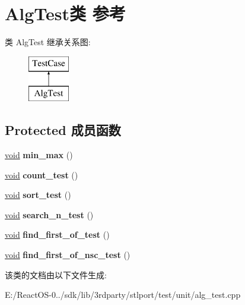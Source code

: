 \hypertarget{class_alg_test}{}\section{Alg\+Test类 参考}
\label{class_alg_test}
类 Alg\+Test 继承关系图\+:\begin{figure}[H]
\begin{center}
\leavevmode
\includegraphics[height=2.000000cm]{class_alg_test}
\end{center}
\end{figure}
\subsection*{Protected 成员函数}
\begin{DoxyCompactItemize}
\item 
\mbox{\label{class_alg_test_ad970b34f74b697f018554843f0e25a5a}} 
\hyperlink{interfacevoid}{void} {\bfseries min\+\_\+max} ()
\item 
\mbox{\label{class_alg_test_a54a7036464e996a213aeaa2b71a62bda}} 
\hyperlink{interfacevoid}{void} {\bfseries count\+\_\+test} ()
\item 
\mbox{\label{class_alg_test_ae71cd44136e062f73cd88c0f1f4d85c3}} 
\hyperlink{interfacevoid}{void} {\bfseries sort\+\_\+test} ()
\item 
\mbox{\label{class_alg_test_a3ac46d34cdd420aae669bfd5adaf5bed}} 
\hyperlink{interfacevoid}{void} {\bfseries search\+\_\+n\+\_\+test} ()
\item 
\mbox{\label{class_alg_test_aa2d904f9253706e767ae37251cf993ca}} 
\hyperlink{interfacevoid}{void} {\bfseries find\+\_\+first\+\_\+of\+\_\+test} ()
\item 
\mbox{\label{class_alg_test_a6a1a6efef1b618f289758b36fda04a02}} 
\hyperlink{interfacevoid}{void} {\bfseries find\+\_\+first\+\_\+of\+\_\+nsc\+\_\+test} ()
\end{DoxyCompactItemize}


该类的文档由以下文件生成\+:\begin{DoxyCompactItemize}
\item 
E\+:/\+React\+O\+S-\/0../sdk/lib/3rdparty/stlport/test/unit/alg\+\_\+test.\+cpp\end{DoxyCompactItemize}
